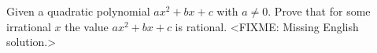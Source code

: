 \problem
Given a quadratic polynomial $a x^2 + b x + c$ with $a \neq 0$.
Prove that for some irrational $x$ the value $a x ^ 2 + b x + c$ is
rational.
\solution
<FIXME: Missing English solution.>
\endproblem

